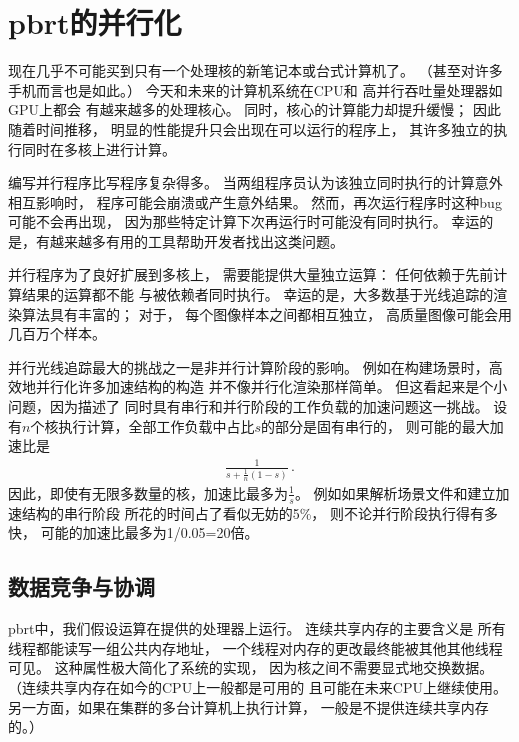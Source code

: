 \section{pbrt的并行化}\label{sec:pbrt的并行化}

现在几乎不可能买到只有一个处理核的新笔记本或台式计算机了。
（甚至对许多手机而言也是如此。）
今天和未来的计算机系统在CPU和
高并行吞吐量处理器如GPU上都会
有越来越多的处理核心。
同时，核心的计算能力却提升缓慢；
因此随着时间推移，
明显的性能提升只会出现在可以运行的程序上，
其许多独立的执行同时在多核上进行计算。

编写并行程序比写程序复杂得多。
当两组程序员认为该独立同时执行的计算意外相互影响时，
程序可能会崩溃或产生意外结果。
然而，再次运行程序时这种bug可能不会再出现，
因为那些特定计算下次再运行时可能没有同时执行。
幸运的是，有越来越多有用的工具帮助开发者找出这类问题。

并行程序为了良好扩展到多核上，
需要能提供大量独立运算：
任何依赖于先前计算结果的运算都不能
与被依赖者同时执行。
幸运的是，大多数基于光线追踪的渲染算法具有丰富的；
对于，
每个图像样本之间都相互独立，
高质量图像可能会用几百万个样本。

并行光线追踪最大的挑战之一是非并行计算阶段的影响。
例如在构建场景时，高效地并行化许多加速结构的构造
并不像并行化渲染那样简单。
但这看起来是个小问题，因为描述了
同时具有串行和并行阶段的工作负载的加速问题这一挑战。
设有$n$个核执行计算，全部工作负载中占比$s$的部分是固有串行的，
则可能的最大加速比是
\begin{align*}
    \frac{1}{\displaystyle s+\frac{1}{n}(1-s)}\, .
\end{align*}
因此，即使有无限多数量的核，加速比最多为$\displaystyle\frac{1}{s}$。
例如如果解析场景文件和建立加速结构的串行阶段
所花的时间占了看似无妨的5\%，
则不论并行阶段执行得有多快，
可能的加速比最多为1/0.05=20倍。

\subsection{数据竞争与协调}
pbrt中，我们假设运算在提供的处理器上运行。
连续共享内存的主要含义是
所有线程都能读写一组公共内存地址，
一个线程对内存的更改最终能被其他其他线程可见。
这种属性极大简化了系统的实现，
因为核之间不需要显式地交换数据。
（连续共享内存在如今的CPU上一般都是可用的
且可能在未来CPU上继续使用。
另一方面，如果在集群的多台计算机上执行计算，
一般是不提供连续共享内存的。）

